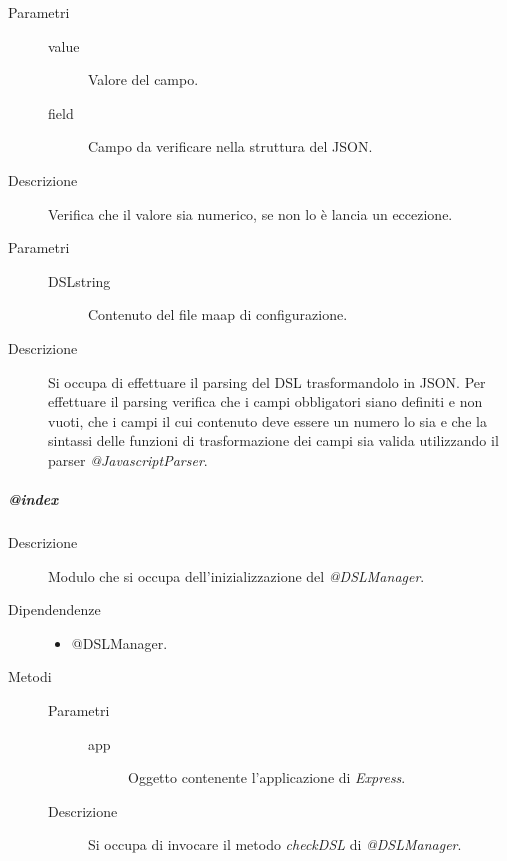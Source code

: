 \begin{description}
\begin{mldescription}
  \hfill
 \begin{description}
     		\item[Parametri] \hfill
     			\begin{description}
     				\item[value]
     				 Valore del campo.
     				\item[field]
     				 Campo da verificare nella struttura del JSON.
     			\end{description}
     		\item[Descrizione]
     		Verifica che il valore sia numerico, se non lo è lancia un eccezione.
   \end{description}
  \hfill
 \begin{description}
     		\item[Parametri] \hfill
     			\begin{description}
     				\item[DSLstring]
     				Contenuto del file maap di configurazione.
     			\end{description}
     		\item[Descrizione]
     		Si occupa di effettuare il parsing del DSL trasformandolo in JSON. Per effettuare il parsing verifica che i campi obbligatori siano definiti e non vuoti, che i campi il cui contenuto deve essere un numero lo sia e che la sintassi delle funzioni di trasformazione dei campi sia valida utilizzando il parser \textit{@JavascriptParser}.
   \end{description}
 \end{mldescription}
 
\end{description}
\subparagraph{@index}
\begin{description}
 \item[Descrizione] \hfill
  Modulo che si occupa dell'inizializzazione del \textit{@DSLManager}.
 \item[Dipendendenze] \hfill
 \begin{itemize}
  \item{@DSLManager}.
 \end{itemize}
  
 \item[Metodi]
 \begin{mldescription}
 \hfill
 \begin{description}
     		\item[Parametri] \hfill
     			\begin{description}
     				\item[app]
     				Oggetto contenente l'applicazione di \textit{Express}.
     			\end{description}
     		\item[Descrizione]
     		Si occupa di invocare il metodo \textit{checkDSL} di \textit{@DSLManager}.
   \end{description}
 \end{mldescription}
 
\end{description}
